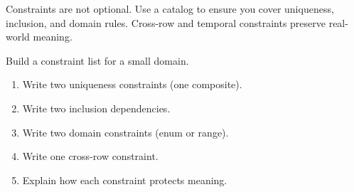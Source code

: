 \begin{chaptersummary}
Constraints are not optional.
Use a catalog to ensure you cover uniqueness, inclusion, and domain rules.
Cross-row and temporal constraints preserve real-world meaning.
\end{chaptersummary}

\begin{exercisebox}
Build a constraint list for a small domain.
\begin{enumerate}[label=\arabic*.]
  \item Write two uniqueness constraints (one composite).
  \item Write two inclusion dependencies.
  \item Write two domain constraints (enum or range).
  \item Write one cross-row constraint.
  \item Explain how each constraint protects meaning.
\end{enumerate}
\end{exercisebox}
